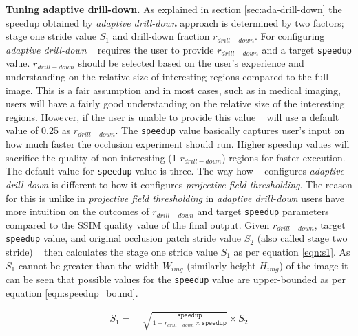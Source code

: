 \vspace{2mm}
\noindent \textbf{Tuning adaptive drill-down.}
As explained in section \ref{sec:ada-drill-down} the speedup obtained by \textit{adaptive drill-down} approach is determined by two factors; stage one stride value $S_1$ and drill-down fraction $r_{drill-down}$.
For configuring \textit{adaptive drill-down} \system~ requires the user to provide $r_{drill-down}$ and a target \texttt{speedup} value.
$r_{drill-down}$ should be selected based on the user's experience and understanding on the relative size of interesting regions compared to the full image.
This is a fair assumption and in most cases, such as in medical imaging, users will have a fairly good understanding on the relative size of the interesting regions.
However, if the user is unable to provide this value \system~ will use a default value of 0.25 as $r_{drill-down}$.
The \texttt{speedup} value basically captures user's input on how much faster the occlusion experiment should run.
Higher speedup values will sacrifice the quality of non-interesting (1-$r_{drill-down}$) regions for faster execution.
The default value for \texttt{speedup} value is three.
The way how \system~ configures \textit{adaptive drill-down} is different to how it configures \textit{projective field thresholding}.
The reason for this is unlike in \textit{projective field thresholding} in \textit{adaptive drill-down} users have more intuition on the outcomes of $r_{drill-down}$ and target \texttt{speedup} parameters compared to the SSIM quality value of the final output.
Given $r_{drill-down}$, target \texttt{speedup} value, and original occlusion patch stride value $S_2$ (also called stage two stride) \system~ then calculates the stage one stride value $S_1$ as per equation \ref{eqn:s1}.
As $S_1$ cannot be greater than the width $W_{img}$ (similarly height $H_{img}$) of the image it can be seen that possible values for the \texttt{speedup} value are upper-bounded as per equation \ref{eqn:speedup_bound}.

\begin{align}
\label{eqn:s1}
S_1 = &~ \sqrt{\frac{\texttt{speedup}}{1 - r_{drill-down} \times \texttt{speedup}}} \times S_2
\end{align}

